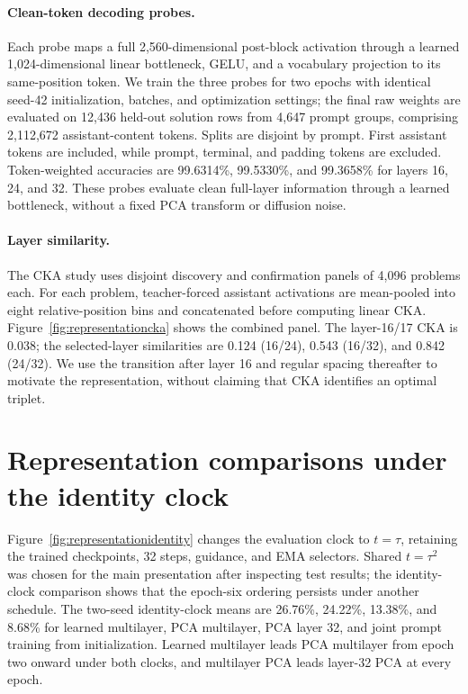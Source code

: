 \paragraph{Clean-token decoding probes.}
Each probe maps a full 2,560-dimensional post-block activation through a learned 1,024-dimensional linear bottleneck, GELU, and a vocabulary projection to its same-position token. We train the three probes for two epochs with identical seed-42 initialization, batches, and optimization settings; the final raw weights are evaluated on 12,436 held-out solution rows from 4,647 prompt groups, comprising 2,112,672 assistant-content tokens. Splits are disjoint by prompt. First assistant tokens are included, while prompt, terminal, and padding tokens are excluded. Token-weighted accuracies are 99.6314\%, 99.5330\%, and 99.3658\% for layers 16, 24, and 32. These probes evaluate clean full-layer information through a learned bottleneck, without a fixed PCA transform or diffusion noise.

\paragraph{Layer similarity.}
The CKA study uses disjoint discovery and confirmation panels of 4,096 problems each. For each problem, teacher-forced assistant activations are mean-pooled into eight relative-position bins and concatenated before computing linear CKA. Figure~\ref{fig:representationcka} shows the combined panel. The layer-16/17 CKA is 0.038; the selected-layer similarities are 0.124 (16/24), 0.543 (16/32), and 0.842 (24/32). We use the transition after layer 16 and regular spacing thereafter to motivate the representation, without claiming that CKA identifies an optimal triplet.

\section{Representation comparisons under the identity clock}
\label{app:representationclock}

Figure~\ref{fig:representationidentity} changes the evaluation clock to $t=\tau$, retaining the trained checkpoints, 32 steps, guidance, and EMA selectors. Shared $t=\tau^2$ was chosen for the main presentation after inspecting test results; the identity-clock comparison shows that the epoch-six ordering persists under another schedule. The two-seed identity-clock means are 26.76\%, 24.22\%, 13.38\%, and 8.68\% for learned multilayer, PCA multilayer, PCA layer 32, and joint prompt training from initialization. Learned multilayer leads PCA multilayer from epoch two onward under both clocks, and multilayer PCA leads layer-32 PCA at every epoch.

